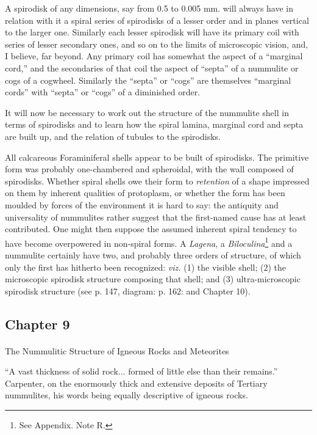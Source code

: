 \documentclass[a4paper, 12pt, oneside]{article}
\begin{document}
A spirodisk of any dimensions, say from 0.5 to 0.005 mm. will always have in relation with it a spiral series of spirodisks of a lesser order and in planes vertical to the larger one. Similarly each lesser spirodisk will have its primary coil with series of lesser secondary ones, and so on to the limits of microscopic vision, and, I believe, far beyond. Any primary coil has somewhat the aspect of a ``marginal cord,'' and the secondaries of that coil the aspect of ``septa'' of a nummulite or cogs of a cogwheel. Similarly the ``septa'' or ``cogs'' are themselves ``marginal cords'' with ``septa'' or ``cogs'' of a diminished order.

It will now be necessary to work out the structure of the nummulite shell in terms of spirodisks and to learn how the spiral lamina, marginal cord and septa are built up, and the relation of tubules to the spirodisks.

All calcareous Foraminiferal shells appear to be built of spirodisks. The primitive form was probably one-chambered and spheroidal, with the wall composed of spirodisks. Whether spiral shells owe their form to \emph{retention} of a shape impressed on them by inherent qualities of protoplasm, or whether the form has been moulded by forces of the environment it is hard to say: the antiquity and universality of nummulites rather suggest that the first-named cause has at least contributed. One might then suppose the assumed inherent spiral tendency to have become overpowered in non-spiral forms. A \emph{Lagena}, a \emph{Biloculina}\footnote{See Appendix. Note R.} and a nummulite certainly have two, and probably three orders of structure, of which only the first has hitherto been recognized: \emph{viz.} (1) the visible shell; (2) the microscopic spirodisk structure composing that shell; and (3) ultra-microscopic spirodisk structure (see p. 147, diagram: p. 162: and Chapter 10).
\clearpage
\subsection{Chapter 9}
\paragraph{}
The Nummulitic Structure of Igneous Rocks and Meteorites

``A vast thickness of solid rock... formed of little else than their remains.'' Carpenter, on the enormously thick and extensive deposits of Tertiary nummulites, his words being equally descriptive of igneous rocks.
\end{document}
